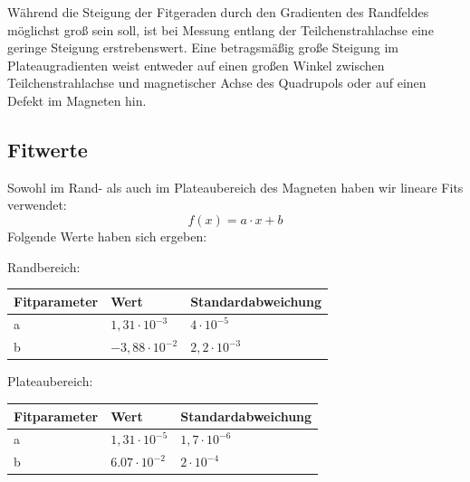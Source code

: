 \documentclass[bigchapter,colorback,accentcolor=tud4b,linedtoc,11pt]{tudreport}
\begin{document}
Während die Steigung der Fitgeraden durch den Gradienten des Randfeldes möglichst groß sein soll, ist bei Messung entlang der Teilchenstrahlachse eine geringe Steigung erstrebenswert. Eine betragsmäßig große Steigung im Plateaugradienten weist entweder auf einen großen Winkel zwischen Teilchenstrahlachse und magnetischer Achse des Quadrupols oder auf einen Defekt im Magneten hin.

\subsection{Fitwerte}
Sowohl im Rand- als auch im Plateaubereich des Magneten haben wir lineare Fits verwendet: 
$$f(x) = a \cdot x + b$$
Folgende Werte haben sich ergeben:

Randbereich:
\begin{center}
  \begin{tabular}{|p{2.6cm}|p{2.6cm}|p{3.5cm}|}
    \hline
    Fitparameter & Wert                   &  Standardabweichung \\ \hline
    a            & $1,31 \cdot 10^{-3}$   & $4 \cdot 10^{-5}$   \\ \hline
    b            & $-3,88 \cdot 10^{-2}$  & $2,2 \cdot 10^{-3}$ \\ \hline
	\end{tabular}
\end{center}


Plateaubereich:
\begin{center}
  \begin{tabular}{|p{2.6cm}|p{2.6cm}|p{3.5cm}|}
    \hline
    Fitparameter & Wert                  & Standardabweichung  \\ \hline
    a            & $1,31 \cdot 10^{-5}$  & $1,7 \cdot 10^{-6}$ \\ \hline
    b            & $6.07 \cdot 10^{-2}$  & $2 \cdot 10^{-4}$   \\ \hline
	\end{tabular}
\end{center}
\end{document}
